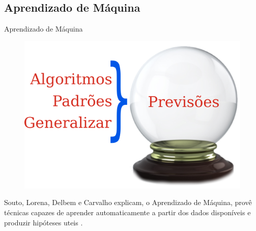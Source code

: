 \subsection{Aprendizado de Máquina}
    \begin{frame}[fragile]{Aprendizado de Máquina}
        \begin{figure}[H]
        \begin{center}
            \includegraphics[scale=0.50]{images/previsao.png}
        \end{center}
        \end{figure}

        Souto, Lorena, Delbem e Carvalho explicam, o Aprendizado de Máquina, 
        provê técnicas capazes de aprender automaticamente a partir dos dados 
        disponíveis e produzir hipóteses uteis \cite{de2003tecnicas}.

  \end{frame}
  
